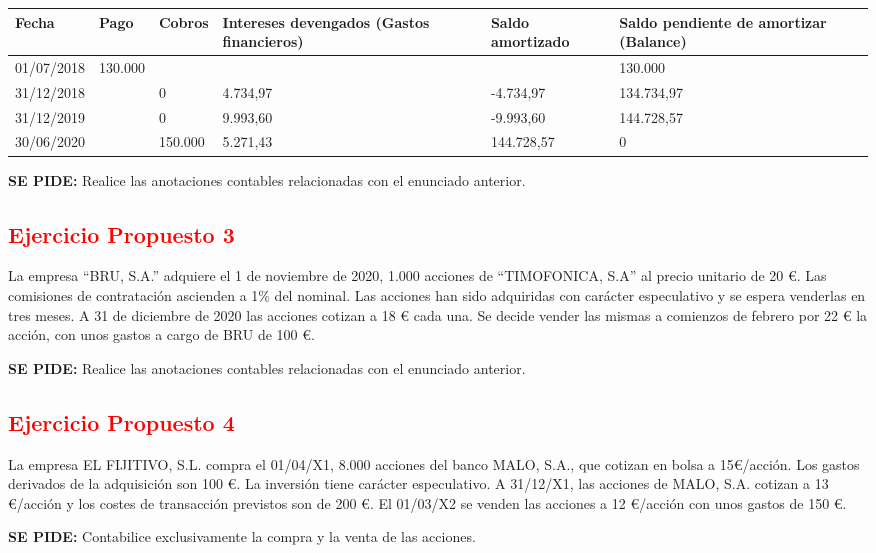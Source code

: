 \begin{table}[H]
    \centering
    \begin{tabular}{|p{3cm}|p{2cm}|p{2cm}|p{2cm}|p{2cm}|p{2cm}|}
        \hline
        \textbf{Fecha} & \textbf{Pago} & \textbf{Cobros} & \textbf{Intereses devengados (Gastos financieros)} & \textbf{Saldo amortizado} & \textbf{Saldo pendiente de amortizar (Balance)} \\
        \hline
        01/07/2018 & 130.000 & & & & 130.000 \\
        \hline
        31/12/2018 & & 0& 4.734,97 & -4.734,97 & 134.734,97  \\
        \hline
        31/12/2019 & & 0 & 9.993,60 & -9.993,60 & 144.728,57  \\
        \hline
        30/06/2020 & &150.000 & 5.271,43 & 144.728,57 & 0  \\
        \hline
    \end{tabular}
\end{table}

\textbf{SE PIDE:} Realice las anotaciones contables relacionadas con el enunciado anterior.

\subsection*{\textcolor{red}{Ejercicio Propuesto 3}}

La empresa “BRU, S.A.” adquiere el 1 de noviembre de 2020, 1.000 acciones de “TIMOFONICA, S.A” al precio unitario de 20 €. Las comisiones de contratación ascienden a 1\% del nominal. Las acciones han sido adquiridas con carácter especulativo y se espera venderlas en tres meses. A 31 de diciembre de 2020 las acciones cotizan a 18 € cada una. Se decide vender las mismas a comienzos de febrero por 22 € la acción, con unos gastos a cargo de BRU de 100 €.

\textbf{SE PIDE:} Realice las anotaciones contables relacionadas con el enunciado anterior.

\subsection*{\textcolor{red}{Ejercicio Propuesto 4}}

La empresa EL FIJITIVO, S.L. compra el 01/04/X1, 8.000 acciones del banco MALO, S.A., que cotizan en bolsa a 15€/acción. Los gastos derivados de la adquisición son 100 €. La inversión tiene carácter especulativo. A 31/12/X1, las acciones de MALO, S.A. cotizan a 13 €/acción y los costes de transacción previstos son de 200 €. El 01/03/X2 se venden las acciones a 12 €/acción con unos gastos de 150 €.

\textbf{SE PIDE:} Contabilice exclusivamente la compra y la venta de las acciones.





